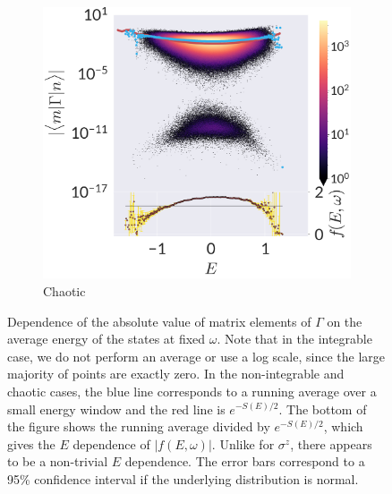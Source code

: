 \begin{figure}
\begin{subfigure}[t]{0.33\textwidth}
\includegraphics[width=\columnwidth]{figures/chapter1/Gamma-E-NI.png}
\caption{Chaotic}
\end{subfigure}

\caption{Dependence of the absolute value of matrix elements of $\Gamma$ on the average energy of the states at fixed $\omega$. Note that in the integrable case, we do not perform an average or use a log scale, since the large majority of points are exactly zero. In the non-integrable and chaotic cases, the blue line corresponds to a running average over a small energy window and the red line is $e^{-S(E)/2}$. The bottom of the figure shows the running average divided by $e^{-S(E)/2}$, which gives the $E$ dependence of $|f(E,\omega)|$. Unlike for $\sigma^z$, there appears to be a non-trivial $E$ dependence. The error bars correspond to a 95\% confidence interval if the underlying distribution is normal.}
\label{fig:edep-gamma}
\end{figure}

